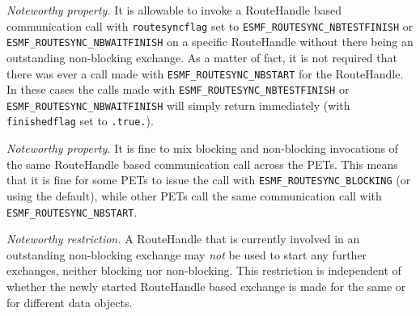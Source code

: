    {\em Noteworthy property.}
   It is allowable to invoke a RouteHandle based communication call
   with {\tt routesyncflag} set to 
   {\tt ESMF\_ROUTESYNC\_NBTESTFINISH} or
   {\tt ESMF\_ROUTESYNC\_NBWAITFINISH} on a specific RouteHandle without there 
   being an outstanding non-blocking exchange. As a matter of fact, it is not
   required that there was ever a call made with {\tt ESMF\_ROUTESYNC\_NBSTART} for
   the RouteHandle. In these cases the calls made with
   {\tt ESMF\_ROUTESYNC\_NBTESTFINISH} or {\tt ESMF\_ROUTESYNC\_NBWAITFINISH}  will
   simply return immediately (with {\tt finishedflag} set to {\tt .true.}).
  
   {\em Noteworthy property.}
   It is fine to mix blocking and non-blocking invocations of the same 
   RouteHandle based communication call across the PETs. This means that it is
   fine for some PETs to issue the call with {\tt ESMF\_ROUTESYNC\_BLOCKING}
   (or using the default), while other PETs call the same communication call
   with {\tt ESMF\_ROUTESYNC\_NBSTART}.
  
   {\em Noteworthy restriction.}
   A RouteHandle that is currently involved in an outstanding non-blocking
   exchange may {\em not} be used to start any further exchanges, neither
   blocking nor non-blocking. This restriction is independent of whether the
   newly started RouteHandle based exchange is made for the same or for 
   different data objects.
   
\setlength{\parskip}{\oldparskip}
\setlength{\parindent}{\oldparindent}
\setlength{\baselineskip}{\oldbaselineskip}
